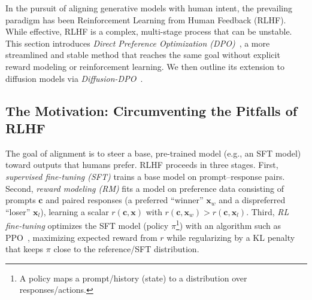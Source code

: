 
In the pursuit of aligning generative models with human intent, the prevailing paradigm has been Reinforcement Learning from Human Feedback (RLHF). While effective, RLHF is a complex, multi-stage process that can be unstable. This section introduces \emph{Direct Preference Optimization (DPO)}~\citep{rafailov2023direct}, a more streamlined and stable method that reaches the same goal without explicit reward modeling or reinforcement learning. We then outline its extension to diffusion models via \emph{Diffusion-DPO}~\citep{wallace2024diffusion}.

\subsection{The Motivation: Circumventing the Pitfalls of RLHF}

The goal of alignment is to steer a base, pre-trained model (e.g., an SFT model) toward outputs that humans prefer. RLHF proceeds in three stages. First, \emph{supervised fine-tuning (SFT)} trains a base model on prompt–response pairs. Second, \emph{reward modeling (RM)} fits a model on preference data consisting of prompts $\mathbf{c}$ and paired responses (a preferred ``winner'' $\mathbf{x}_w$ and a dispreferred ``loser'' $\mathbf{x}_l$), learning a scalar $r(\mathbf{c},\mathbf{x})$ with $r(\mathbf{c},\mathbf{x}_w)>r(\mathbf{c},\mathbf{x}_l)$. Third, \emph{RL fine-tuning} optimizes the SFT model (policy $\pi$\footnote{A policy maps a prompt/history (state) to a distribution over responses/actions.}) with an algorithm such as PPO~\citep{schulman2017proximal}, maximizing expected reward from $r$ while regularizing by a KL penalty that keeps $\pi$ close to the reference/SFT distribution.

